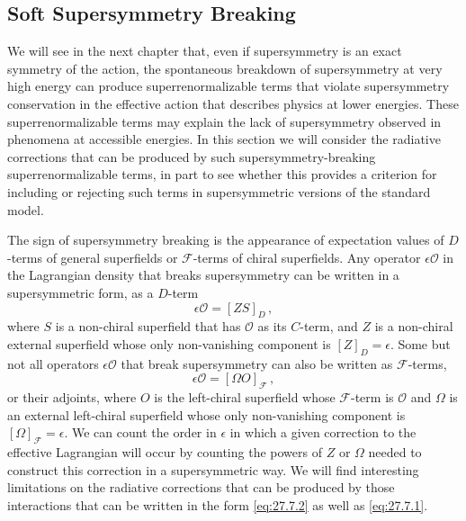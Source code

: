 
\subsection[Soft Supersymmetry Breaking]{Soft Supersymmetry Breaking\footnotemark}

We will see in the next chapter that, even if supersymmetry is an exact
symmetry of the action, the spontaneous breakdown of supersymmetry at very
high energy can produce superrenormalizable terms that violate supersymmetry
conservation in the effective action that describes physics at lower
energies. These superrenormalizable terms may explain the lack of
supersymmetry observed in phenomena at accessible energies. In this section
we will consider the radiative corrections that can be produced by such
supersymmetry-breaking superrenormalizable terms, in part to see whether this
provides a criterion for including or rejecting such terms in supersymmetric
versions of the standard model.

The sign of supersymmetry breaking is the appearance of expectation values
of \(D\)-terms of general superfields or \(\mathcal{F}\)-terms of chiral
superfields. Any operator \(\epsilon\mathcal{O}\) in the Lagrangian density
that breaks supersymmetry can be written in a supersymmetric form, as a
\(D\)-term
\begin{equation}
  \epsilon\mathcal{O}=[ZS]_D\,,
  \tag{27.7.1}\label{eq:27.7.1}
\end{equation}
where \(S\) is a non-chiral superfield that has \(\mathcal{O}\) as its
\(C\)-term, and \(Z\) is a non-chiral external superfield whose only
non-vanishing component is \([Z]_D=\epsilon\). Some but not all operators
\(\epsilon\mathcal{O}\) that break supersymmetry can also be written as
\(\mathcal{F}\)-terms,
\begin{equation}
  \epsilon\mathcal{O}=[\Omega O]_{\mathcal{F}}\,,
  \tag{27.7.2}\label{eq:27.7.2}
\end{equation}
or their adjoints, where \(O\) is the left-chiral superfield whose
\(\mathcal{F}\)-term is \(\mathcal{O}\) and \(\Omega\) is an external
left-chiral superfield whose only non-vanishing component is
\([\Omega]_{\mathcal{F}}=\epsilon\). We can count the order in \(\epsilon\)
in which a given correction to the effective Lagrangian will occur by
counting the powers of \(Z\) or \(\Omega\) needed to construct this correction
in a supersymmetric way. We will find interesting limitations on the
radiative corrections that can be produced by those interactions that can be
written in the form \eqref{eq:27.7.2} as well as \eqref{eq:27.7.1}.


